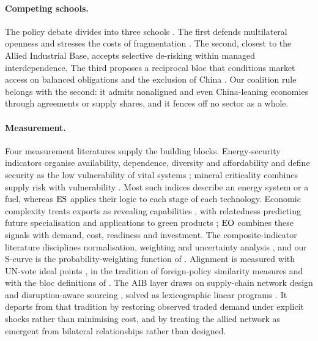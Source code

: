 \paragraph{Competing schools.} The policy debate divides into three schools
\citep{neis2026allied}. The first defends multilateral openness and stresses the costs of
fragmentation \citep{aiyar2023geoeconomic, oecd2025supply}. The second, closest to the Allied
Industrial Base, accepts selective de-risking within managed interdependence. The third proposes
a reciprocal bloc that conditions market access on balanced obligations and the exclusion of
China \citep{cass2025grand}. Our coalition rule belongs with the second: it admits nonaligned and
even China-leaning economies through agreements or supply shares, and it fences off no sector as
a whole.

\paragraph{Measurement.} Four measurement literatures supply the building blocks. Energy-security
indicators organise availability, dependence, diversity and affordability
\citep{kruyt2009indicators, sovacool2011conceptualizing, ang2015energy, jewell2011iea} and define
security as the low vulnerability of vital systems \citep{cherp2014concept,
winzer2012conceptualizing}; mineral criticality combines supply risk with vulnerability
\citep{graedel2012methodology, nassar2020evaluating, kowalski2023raw}. Most such indices describe
an energy system or a fuel, whereas $\mathrm{ES}$ applies their logic to each stage of each technology.
Economic complexity treats exports as revealing capabilities \citep{balassa1965trade,
hidalgo2007product, hausmann2006structural, hidalgo2009building, hausmann2014atlas}, with
relatedness predicting future specialisation \citep{hausmann2022implied} and applications to
green products \citep{mealy2022economic, growthlab2024greenplexity}; $\mathrm{EO}$ combines these signals
with demand, cost, readiness and investment. The composite-indicator literature disciplines
normalisation, weighting and uncertainty analysis \citep{oecd2008handbook, saisana2005uncertainty,
paruolo2013ratings}, and our S-curve is the probability-weighting function of
\citet{karmarkar1978subjectively}. Alignment is measured with UN-vote ideal points
\citep{bailey2017estimating, voeten2009unga}, in the tradition of foreign-policy similarity
measures \citep{signorino1999taub} and with the bloc definitions of \citet{gopinath2025changing}.
The AIB layer draws on supply-chain network design and disruption-aware sourcing
\citep{geoffrion1974multicommodity, melo2009facility, tomlin2006value, snyder2016orms}, solved as
lexicographic linear programs \citep{ehrgott2005multicriteria}. It departs from that tradition by
restoring observed traded demand under explicit shocks rather than minimising cost, and by treating
the allied network as emergent from bilateral relationships rather than designed.


